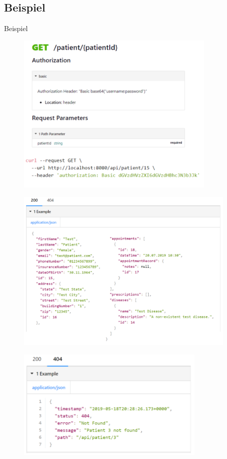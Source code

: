 \documentclass{beamer}
\begin{document}
\subsection{Beispiel}

\begin{frame}{Beispiel}

\begin{figure}
\includegraphics[width=95mm]{GET.png}
\end{figure}

\end{frame}

\begin{frame}

\begin{figure}
\includegraphics[width=105mm]{GET_RES.png}
\end{figure}

\end{frame}


\begin{frame}

\begin{figure}
\includegraphics[width=90mm]{GET_404.png}
\end{figure}

\end{frame}
\end{document}
